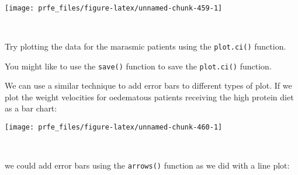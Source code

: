 \documentclass[
  12pt,
  a4paper]{book}
\newenvironment{Shaded}{\begin{snugshade}}{\end{snugshade}}
\newcommand{\AttributeTok}[1]{\textcolor[rgb]{0.77,0.63,0.00}{#1}}
\newcommand{\DecValTok}[1]{\textcolor[rgb]{0.00,0.00,0.81}{#1}}
\newcommand{\FloatTok}[1]{\textcolor[rgb]{0.00,0.00,0.81}{#1}}
\newcommand{\FunctionTok}[1]{\textcolor[rgb]{0.00,0.00,0.00}{#1}}
\newcommand{\NormalTok}[1]{#1}
\newcommand{\SpecialCharTok}[1]{\textcolor[rgb]{0.00,0.00,0.00}{#1}}
\newcommand{\StringTok}[1]{\textcolor[rgb]{0.31,0.60,0.02}{#1}}
\begin{document}
~

\begin{Shaded}
\end{Shaded}

\begin{center}\texttt{[image: prfe\_files/figure-latex/unnamed-chunk-459-1]} \end{center}

~

Try plotting the data for the marasmic patients using the \texttt{plot.ci()} function.

You might like to use the \texttt{save()} function to save the \texttt{plot.ci()} function.

We can use a similar technique to add error bars to different types of plot. If we plot the weight velocities for oedematous patients receiving the high protein diet as a bar chart:

\newpage

\begin{Shaded}
\end{Shaded}

\begin{center}\texttt{[image: prfe\_files/figure-latex/unnamed-chunk-460-1]} \end{center}

~

we could add error bars using the \texttt{arrows()} function as we did with a line plot:

~

\begin{Shaded}
\end{Shaded}
\end{document}
